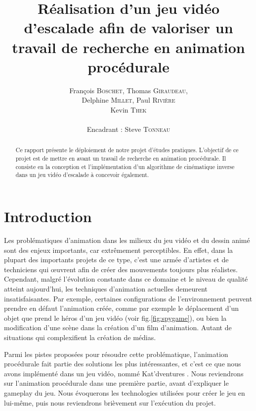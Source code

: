 \documentclass[a4paper,11pt]{article}
\title{ \textbf{Réalisation d'un jeu vidéo d'escalade afin de valoriser un travail de recherche en 
animation procédurale} }
\author{François \textsc{Boschet}, Thomas \textsc{Giraudeau}, \\
        Delphine \textsc{Millet}, Paul \textsc{Rivière} \\
        Kevin \textsc{Thek} \\
        \\
        Encadrant : Steve \textsc{Tonneau}}
\date{}                    %
\begin{document}
          

\maketitle                 %
\thispagestyle{empty}      %



\begin{abstract}
Ce rapport présente le déploiement de notre projet d'études pratiques. L'objectif de ce projet est de mettre en avant un travail de recherche en animation procédurale. Il consiste en la conception et l'implémentation d'un algorithme de cinématique inverse dans un jeu vidéo d'escalade à concevoir également.

\end{abstract} 


\section{Introduction}  

Les problématiques d'animation dans les milieux du jeu vidéo et du dessin animé sont des enjeux importants, car extrêmement perceptibles. En effet, dans la plupart des importants projets de ce type, c'est une armée d'artistes et de techniciens qui {\oe}uvrent afin de créer des mouvements toujours plus réalistes. \\
Cependant, malgré l'évolution constante dans ce domaine et le niveau de qualité atteint aujourd'hui, les techniques d'animation actuelles demeurent insatisfaisantes. Par exemple, certaines configurations de l'environnement peuvent prendre en défaut l'animation créée, comme par exemple le déplacement d'un objet que prend le héros d'un jeu vidéo (voir fig.\ref{fig:spygame}), ou bien la modification d'une scène dans la création d'un film d'animation. Autant de situations qui complexifient la création de médias.\\   

Parmi les pistes proposées pour résoudre cette problématique, l'animation procédurale fait partie des solutions les plus intéressantes, et c'est ce que nous avons implémenté dans un jeu vidéo, nommé \og Kat'dventures \fg{}  . Nous reviendrons sur l'animation procédurale dans une première partie, avant d'expliquer le gameplay du jeu. Nous évoquerons les technologies utilisées pour créer le jeu en lui-même, puis nous reviendrons brièvement sur l'exécution du projet.
\end{document}

